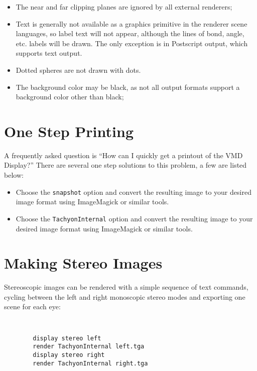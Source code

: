 \begin{itemize}
  \item The near and far clipping planes are ignored by all external renderers;
  \item Text is generally not available as a graphics primitive in the
        renderer scene languages, so label text will not
        appear, although the lines of bond, angle, etc. labels will be
        drawn.  The only exception is in Postscript output, which supports
        text output.
  \item Dotted spheres are not drawn with dots.
  \item The background color may be black, as not all output formats support
        a background color other than black;
\end{itemize}


\section{One Step Printing}
A frequently asked question is ``How can I quickly get a printout of
the VMD Display?'' There are several one step solutions to this
problem, a few are listed below:
\begin{itemize}
\item Choose the {\tt snapshot} option and convert the resulting
      image to your desired image format using ImageMagick or similar tools.
\item Choose the {\tt TachyonInternal} option and convert the resulting
      image to your desired image format using ImageMagick or similar tools.
\end{itemize}


\section{Making Stereo Images}
Stereoscopic images can be rendered with a simple sequence 
of text commands, cycling between the left and right monoscopic 
stereo modes and exporting one scene for each eye:
{\tt
\begin{verbatim}
        display stereo left
        render TachyonInternal left.tga
        display stereo right
        render TachyonInternal right.tga
\end{verbatim}
}

